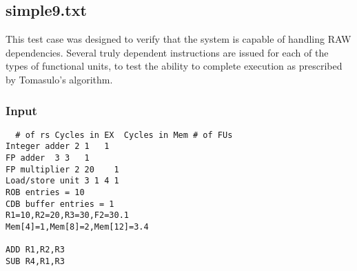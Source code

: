 \documentclass[12pt]{article}
\begin{document}
\subsection{simple9.txt}
This test case was designed to verify that the system is capable of handling RAW dependencies.  Several truly dependent instructions are issued for each of the types of functional units, to test the ability to complete execution as prescribed by Tomasulo's algorithm.

\subsubsection*{Input}
\begin{verbatim}
  # of rs Cycles in EX  Cycles in Mem # of FUs
Integer adder 2 1   1
FP adder  3 3   1
FP multiplier 2 20    1
Load/store unit 3 1 4 1
ROB entries = 10
CDB buffer entries = 1
R1=10,R2=20,R3=30,F2=30.1
Mem[4]=1,Mem[8]=2,Mem[12]=3.4

ADD R1,R2,R3
SUB R4,R1,R3
\end{verbatim}
\end{document}
